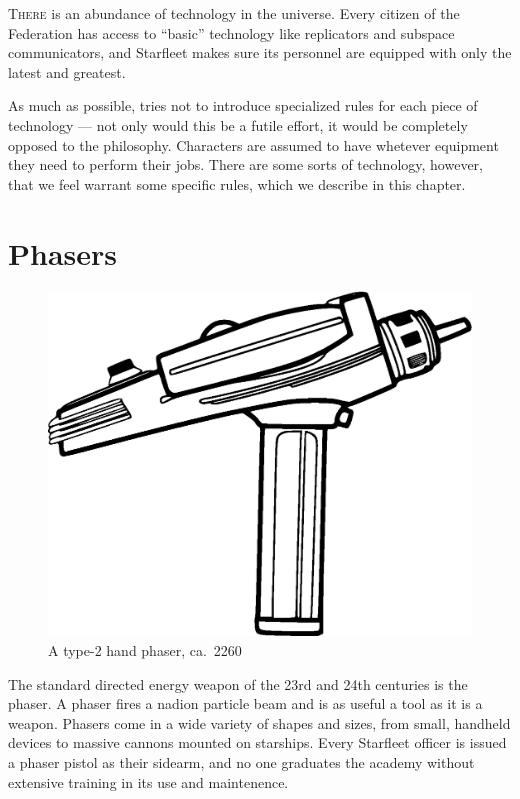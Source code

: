 \documentclass[12pt,titlepage,openany]{book}
\begin{document}
\lettrine[lines=1]{T}{here} is an abundance of technology in the \StarTrek{}
universe. Every citizen of the Federation has access to ``basic'' technology
like replicators and subspace communicators, and Starfleet makes sure its
personnel are equipped with only the latest and greatest.

As much as possible, \StarTrekFate{} tries not to introduce specialized rules
for each piece of technology --- not only would this be a futile effort, it
would be completely opposed to the \Fate{} philosophy. Characters are assumed
to have whetever equipment they need to perform their jobs. There are some
sorts of technology, however, that we feel warrant some specific rules, which
we describe in this chapter.

\section{Phasers}\label{sec:phasers}

\begin{figure}
    \vspace{-3em}
    \centering
    \includegraphics[width=0.8\linewidth]{img/Phaser.eps}\\
    \vspace{2ex}
    \footnotesize A type-2 hand phaser, ca.\ 2260
\end{figure}

The standard directed energy weapon of the 23rd and 24th centuries is the
phaser. A phaser fires a nadion particle beam and is as useful a tool as it is
a weapon. Phasers come in a wide variety of shapes and sizes, from small,
handheld devices to massive cannons mounted on starships. Every Starfleet
officer is issued a phaser pistol as their sidearm, and no one graduates the
academy without extensive training in its use and maintenence.
\end{document}
